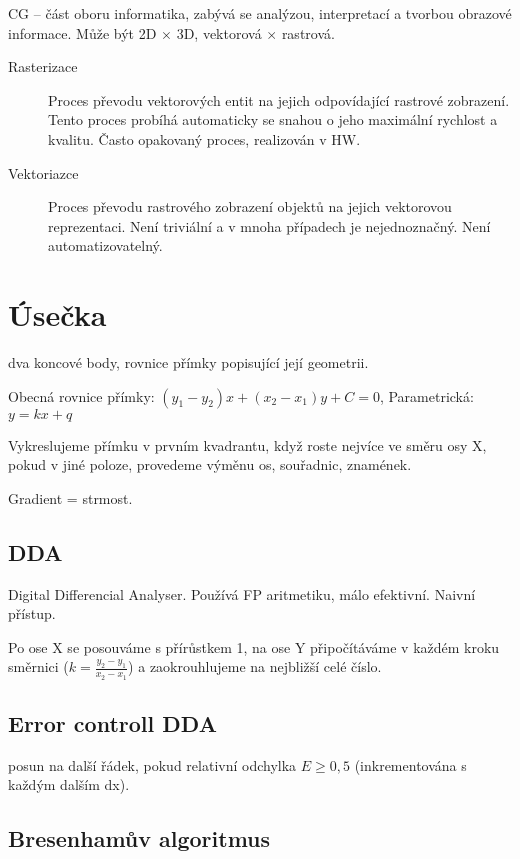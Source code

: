\documentclass[a4paper, 11pt]{report}
\begin{document}
CG -- část oboru informatika, zabývá se analýzou, interpretací a tvorbou obrazové informace. Může být 2D $\times$ 3D, vektorová $\times$ rastrová.

\begin{description}
	\item[Rasterizace] Proces převodu vektorových entit na jejich odpovídající rastrové zobrazení. Tento proces probíhá automaticky se snahou o jeho maximální rychlost a kvalitu. Často opakovaný proces, realizován v HW.
	\item[Vektoriazce] Proces převodu rastrového zobrazení objektů na jejich vektorovou reprezentaci. Není triviální a v mnoha případech je nejednoznačný. Není automatizovatelný.
\end{description}

\section{Úsečka}
dva koncové body, rovnice přímky popisující její geometrii.

Obecná rovnice přímky: $(y_1 - y_2) x + (x_2 - x_1) y + C = 0$, Parametrická: $y = kx + q$

Vykreslujeme přímku v prvním kvadrantu, když roste nejvíce ve směru osy X, pokud v jiné poloze, provedeme výměnu os, souřadnic, znamének.

Gradient = strmost.

\subsection{DDA}

Digital Differencial Analyser. Používá FP aritmetiku, málo efektivní. Naivní přístup.

Po ose X se posouváme s přírůstkem 1, na ose Y připočítáváme v každém kroku směrnici ($k = \frac{y_2-y_1}{x_2-x_1}$) a zaokrouhlujeme na nejbližší celé číslo.

\subsection{Error controll DDA}

posun na další řádek, pokud relativní odchylka $ E \geq 0,5$ (inkrementována s každým dalším dx).

\subsection{Bresenhamův algoritmus}
\end{document}

